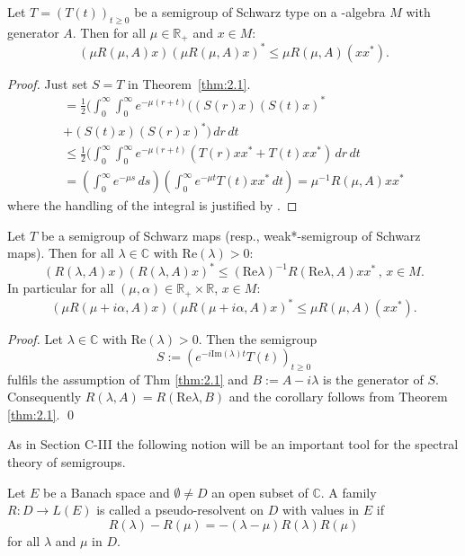 \begin{corollary}\label{cor:2.2}
Let $ T = (T(t))_{t\geq0} $ be a semigroup of Schwarz type on a \CA-algebra $ M $ with generator $ A $.
Then for all $ \mu \in \mathbb{R}_{+} $ and $ x \in M $:
\[
(\mu R(\mu,A)x)(\mu R(\mu,A)x)^{*} \leq \mu R(\mu,A)(xx^{*}).
\]
\end{corollary}
%
\begin{proof}
Just set $ S = T $ in Theorem~\ref{thm:2.1}.
\begin{multline*}
= \frac{1}{2}(\int_{0}^\infty \int_{0}^\infty e^{-\mu(r+t)} ((S(r)x)(S(t)x)^{*} \\
+ (S(t)x)(S(r)x)^{*}) \, dr \, dt \\
\leq \frac{1}{2}(\int_{0}^\infty \int_{0}^\infty e^{-\mu(r+t)} (T(r)xx^{*} + T(t)xx^{*}) \, dr \, dt \\
= (\int_{0}^\infty e^{-\mu s} \, ds)(\int_{0}^\infty e^{-\mu t}T(t)xx^{*} \, dt) = \mu^{-1}R(\mu,A)xx^{*}
\end{multline*}
where the handling of the integral is justified by \textcite[§8, n° 4, Proposition 9]{bourbaki:1955}.
\end{proof}


\begin{corollary}\label{cor:2.3}
Let $ T $ be a semigroup of Schwarz maps (resp., weak*-semigroup of Schwarz maps).
Then for all $ \lambda \in \mathbb{C} $ with $ \text{Re}(\lambda) > 0 $:
\[
(R(\lambda,A)x)(R(\lambda,A)x)^{*} \leq (\text{Re}\lambda)^{-1} R(\text{Re}\lambda,A)xx^{*} \, , \, x \in M .
\]
In particular for all $ (\mu,\alpha) \in \mathbb{R}_{+} \times \mathbb{R} $, $ x \in M $:
\[
(\mu R(\mu+i\alpha,A)x)(\mu R(\mu+i\alpha,A)x)^{*} \leq \mu R(\mu,A)(xx^{*}).
\]
\end{corollary}

\begin{proof}
Let $ \lambda \in \mathbb{C} $ with $ \text{Re}(\lambda) > 0 $.
Then the semigroup
\[
S := (e^{-i\text{Im}(\lambda)t}T(t))_{t\geq0}
\]
fulfils the assumption of Thm \ref{thm:2.1} and $ B := A - i\lambda $ is the generator of $ S $.
Consequently $ R(\lambda,A) = R(\text{Re}\lambda,B) $ and the corollary follows from Theorem \ref{thm:2.1}.
\qed
\end{proof}

As in Section C-III the following notion will be an important tool for the spectral theory of semigroups.

\begin{definition}\label{def:2.3}
Let $ E $ be a Banach space and $ \emptyset \neq D $ an open subset of $ \mathbb{C} $.
A family $ R: D \to L(E) $ is called a pseudo-resolvent on $ D $ with values in $ E $ if
\[
R(\lambda) - R(\mu) = -(\lambda - \mu)R(\lambda)R(\mu)
\]
for all $ \lambda $ and $ \mu $ in $ D $.
\end{definition}


